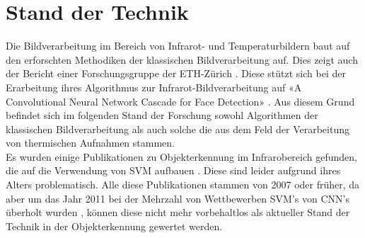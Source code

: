 \chapter{Stand der Technik}
\label{ch:StandDerTechnik}

Die Bildverarbeitung im Bereich von Infrarot- und Temperaturbildern baut auf den erforschten Methodiken der klassischen Bildverarbeitung auf. Dies zeigt auch der Bericht einer Forschungsgruppe der ETH-Zürich \parencite{gomez2018thermal}. Diese stützt sich bei der Erarbeitung ihres Algorithmus zur Infrarot-Bildverarbeitung auf «A Convolutional Neural Network Cascade for Face Detection» \parencite{li2015convolutional}. Aus diesem Grund befindet sich im folgenden Stand der Forschung sowohl Algorithmen der klassischen Bildverarbeitung als auch solche die aus dem Feld der Verarbeitung von thermischen Aufnahmen stammen.\\
Es wurden einige Publikationen zu Objekterkennung im Infrarobereich gefunden, die auf die Verwendung von \gls{SVM} aufbauen \parencite{suard2006pedestrian, bertozzi2003pedestrian, zhang2007pedestrian}. Diese sind leider aufgrund ihres Alters problematisch. Alle diese Publikationen stammen von 2007 oder früher, da aber um das Jahr 2011 bei der Mehrzahl von Wettbewerben \gls{SVM}'s von \gls{CNN}'s überholt wurden \parencite{Historyo5:online}, können diese nicht mehr vorbehaltlos als aktueller Stand der Technik in der Objekterkennung gewertet werden.

